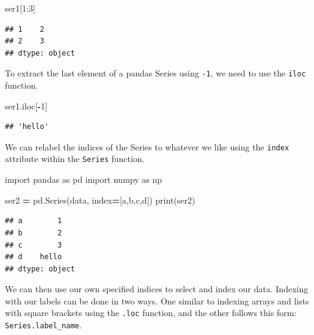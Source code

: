 \documentclass[
]{book}
\newenvironment{Shaded}{\begin{snugshade}}{\end{snugshade}}
\newcommand{\BuiltInTok}[1]{#1}
\newcommand{\DecValTok}[1]{\textcolor[rgb]{0.00,0.00,0.81}{#1}}
\newcommand{\ImportTok}[1]{#1}
\newcommand{\NormalTok}[1]{#1}
\newcommand{\OperatorTok}[1]{\textcolor[rgb]{0.81,0.36,0.00}{\textbf{#1}}}
\newcommand{\StringTok}[1]{\textcolor[rgb]{0.31,0.60,0.02}{#1}}
\begin{document}
\begin{Shaded}
\begin{Highlighting}[]
\NormalTok{ser1[}\DecValTok{1}\NormalTok{:}\DecValTok{3}\NormalTok{]}
\end{Highlighting}
\end{Shaded}

\begin{verbatim}
## 1    2
## 2    3
## dtype: object
\end{verbatim}

To extract the last element of a pandas Series using \texttt{-1}, we need to use the \texttt{iloc} function.

\begin{Shaded}
\begin{Highlighting}[]
\NormalTok{ser1.iloc[}\OperatorTok{{-}}\DecValTok{1}\NormalTok{]}
\end{Highlighting}
\end{Shaded}

\begin{verbatim}
## 'hello'
\end{verbatim}

We can relabel the indices of the Series to whatever we like using the \texttt{index} attribute within the \texttt{Series} function.

\begin{Shaded}
\begin{Highlighting}[]
\ImportTok{import}\NormalTok{ pandas }\ImportTok{as}\NormalTok{ pd }
\ImportTok{import}\NormalTok{ numpy }\ImportTok{as}\NormalTok{ np}

\NormalTok{ser2 }\OperatorTok{=}\NormalTok{ pd.Series(data, index}\OperatorTok{=}\NormalTok{[}\StringTok{\textquotesingle{}a\textquotesingle{}}\NormalTok{,}\StringTok{\textquotesingle{}b\textquotesingle{}}\NormalTok{,}\StringTok{\textquotesingle{}c\textquotesingle{}}\NormalTok{,}\StringTok{\textquotesingle{}d\textquotesingle{}}\NormalTok{])}
\BuiltInTok{print}\NormalTok{(ser2)}
\end{Highlighting}
\end{Shaded}

\begin{verbatim}
## a        1
## b        2
## c        3
## d    hello
## dtype: object
\end{verbatim}

We can then use our own specified indices to select and index our data. Indexing with our labels can be done in two ways. One similar to indexing arrays and lists with square brackets using the \texttt{.loc} function, and the other follows this form: \texttt{Series.label\_name}.
\end{document}
